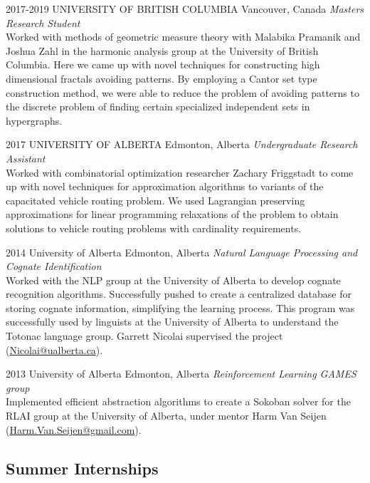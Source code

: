 \documentclass{friggeri-cv}
\begin{document}
\begin{entrylist}

\entry
{2017-2019}
{UNIVERSITY OF BRITISH COLUMBIA}
{Vancouver, Canada}
{\emph{Masters Research Student} \\
Worked with methods of geometric measure theory with Malabika Pramanik and Joshua Zahl in the harmonic analysis group at the University of British Columbia. Here we came up with novel techniques for constructing high dimensional fractals avoiding patterns. By employing a Cantor set type construction method, we were able to reduce the problem of avoiding patterns to the discrete problem of finding certain specialized independent sets in hypergraphs.
}

\entry
{2017}
{UNIVERSITY OF ALBERTA}
{Edmonton, Alberta}
{\emph{Undergraduate Research Assistant} \\
Worked with combinatorial optimization researcher Zachary Friggstadt to come up with novel techniques for approximation algorithms to variants of the capacitated vehicle routing problem. We used Lagrangian preserving approximations for linear programming relaxations of the problem to obtain solutions to vehicle routing problems with cardinality requirements.}

\entry
{2014}
{University of Alberta}
{Edmonton, Alberta}
{\emph{Natural Language Processing and Cognate Identification} \\
Worked with the NLP group at the University of Alberta to develop cognate recognition algorithms. Successfully pushed to create a centralized database for storing cognate information, simplifying the learning process. This program was successfully used by linguists at the University of Alberta to understand the Totonac language group. Garrett Nicolai supervised the project (\href{mailto:Nicolai@ualberta.ca}{Nicolai@ualberta.ca}).}

\entry
{2013}
{University of Alberta}
{Edmonton, Alberta}
{\emph{Reinforcement Learning GAMES group} \\
Implemented efficient abstraction algorithms to create a Sokoban solver for the RLAI group at the University of Alberta, under mentor Harm Van Seijen (\href{mailto:Harm.Van.Seijen@gmail.com}{Harm.Van.Seijen@gmail.com}).}


\end{entrylist}

\subsection{Summer Internships}
\end{document}
